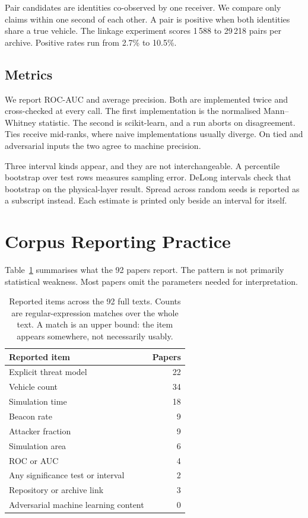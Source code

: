 \documentclass[conference]{IEEEtran}
\begin{document}
Pair candidates are identities co-observed by one receiver.
We compare only claims within one second of each other.
A pair is positive when both identities share a true vehicle.
The linkage experiment scores 1\,588 to 29\,218 pairs per archive.
Positive rates run from 2.7\% to 10.5\%.

\subsection{Metrics}

We report ROC-AUC and average precision.
Both are implemented twice and cross-checked at every call.
The first implementation is the normalised Mann--Whitney statistic.
The second is scikit-learn, and a run aborts on disagreement.
Ties receive mid-ranks, where naive implementations usually diverge.
On tied and adversarial inputs the two agree to machine precision.

Three interval kinds appear, and they are not interchangeable.
A percentile bootstrap over test rows measures sampling error.
DeLong intervals check that bootstrap on the physical-layer result.
Spread across random seeds is reported as a subscript instead.
Each estimate is printed only beside an interval for itself.

\section{Corpus Reporting Practice}

Table~\ref{tab:reporting} summarises what the 92 papers report.
The pattern is not primarily statistical weakness.
Most papers omit the parameters needed for interpretation.

\begin{table}[t]
\caption{Reported items across the 92 full texts.
Counts are regular-expression matches over the whole text.
A match is an upper bound: the item appears somewhere, not necessarily usably.}
\label{tab:reporting}
\centering
\footnotesize
\begin{tabular}{@{}lr@{}}
\toprule
Reported item & Papers \\
\midrule
Explicit threat model & 22 \\
Vehicle count & 34 \\
Simulation time & 18 \\
Beacon rate & 9 \\
Attacker fraction & 9 \\
Simulation area & 6 \\
ROC or AUC & 4 \\
Any significance test or interval & 2 \\
Repository or archive link & 3 \\
Adversarial machine learning content & 0 \\
\bottomrule
\end{tabular}
\end{table}
\end{document}
